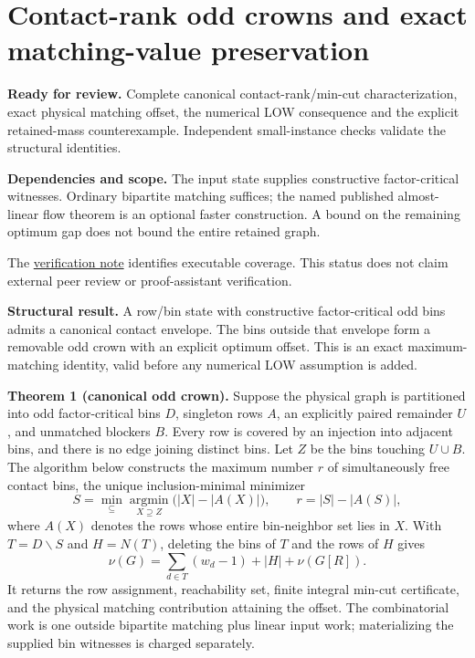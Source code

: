 
\hypertarget{af-f687f276ee-contact-rank-odd-crowns-and-exact-matching-value-preservation}{%
\section{Contact-rank odd crowns and exact matching-value preservation}\label{af-f687f276ee-contact-rank-odd-crowns-and-exact-matching-value-preservation}}

\textbf{Ready for review.} Complete canonical contact-rank/min-cut characterization, exact physical matching offset, the numerical LOW consequence and the explicit retained-mass counterexample. Independent small-instance checks validate the structural identities.

\textbf{Dependencies and scope.} The input state supplies constructive factor-critical witnesses. Ordinary bipartite matching suffices; the named published almost-linear flow theorem is an optional faster construction. A bound on the remaining optimum gap does not bound the entire retained graph.

The \href{https://github.com/icekylinx/algorithm-frontier/blob/main/manuscripts/graph-backends/verify/README.md}{verification note} identifies executable coverage. This status does not claim external peer review or proof-assistant verification.

\textbf{Structural result.} A row/bin state with constructive factor-critical odd bins admits a canonical contact envelope. The bins outside that envelope form a removable odd crown with an explicit optimum offset. This is an exact maximum-matching identity, valid before any numerical LOW assumption is added.

\textbf{Theorem 1 (canonical odd crown).} Suppose the physical graph is partitioned into odd factor-critical bins \(D\), singleton rows \(A\), an explicitly paired remainder \(U\), and unmatched blockers \(B\). Every row is covered by an injection into adjacent bins, and there is no edge joining distinct bins. Let \(Z\) be the bins touching \(U∪B\). The algorithm below constructs the maximum number \(r\) of simultaneously free contact bins, the unique inclusion-minimal minimizer \[
S=\min_{\subseteq}\mathop{\mathrm{argmin}}\limits_{X\supseteq Z}
      \bigl(|X|-|A(X)|\bigr),
\qquad
r=|S|-|A(S)|,
\] where \(A(X)\) denotes the rows whose entire bin-neighbor set lies in \(X\). With \(T=D∖S\) and \(H=N(T)\), deleting the bins of \(T\) and the rows of \(H\) gives \[
\nu(G)=\sum_{d\in T}(w_d-1)+|H|+\nu(G[R]).
\] It returns the row assignment, reachability set, finite integral min-cut certificate, and the physical matching contribution attaining the offset. The combinatorial work is one outside bipartite matching plus linear input work; materializing the supplied bin witnesses is charged separately.

